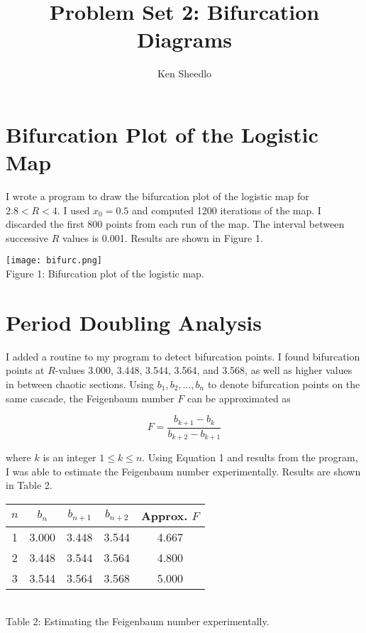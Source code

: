 \documentclass[12pt, letterpaper]{article}
\title{Problem Set 2: Bifurcation Diagrams}
\author{Ken Sheedlo}
\begin{document}
\maketitle{}

\section*{Bifurcation Plot of the Logistic Map}

I wrote a program to draw the bifurcation plot of the logistic map for $2.8 < R
< 4$. I used $x_0 = 0.5$ and computed 1200 iterations of the map. I discarded 
the first 800 points from each run of the map. The interval between successive 
$R$ values is 0.001. Results are shown in Figure 1.

\begin{center}
\texttt{[image: bifurc.png]}
\\
Figure 1: Bifurcation plot of the logistic map.
\end{center}

\section*{Period Doubling Analysis}

I added a routine to my program to detect bifurcation points. I found 
bifurcation points at $R$-values 3.000, 3.448, 3.544, 3.564, and 3.568, as well 
as higher values in between chaotic sections. Using $b_1, b_2, ...,b_n$ to denote
bifurcation points on the same cascade, the Feigenbaum number $F$ can be 
approximated as

\begin{equation}
F = \frac{b_{k+1}-b_k}{b_{k+2}-b_{k+1}}
\end{equation}

where $k$ is an integer $1 \leq k \leq n$. Using Equation 1 and results from 
the program, I was able to estimate the Feigenbaum number experimentally. 
Results are shown in Table 2.

\begin{center}
\begin{tabular}{c | c | c | c | c}
$n$ & $b_n$ & $b_{n+1}$ & $b_{n+2}$ & Approx. $F$ \\ \hline
1 & 3.000 & 3.448 & 3.544 & 4.667 \\
2 & 3.448 & 3.544 & 3.564 & 4.800 \\
3 & 3.544 & 3.564 & 3.568 & 5.000 
\end{tabular}
\\
\vspace{1.0em}
Table 2: Estimating the Feigenbaum number experimentally.
\end{center}
\end{document}
